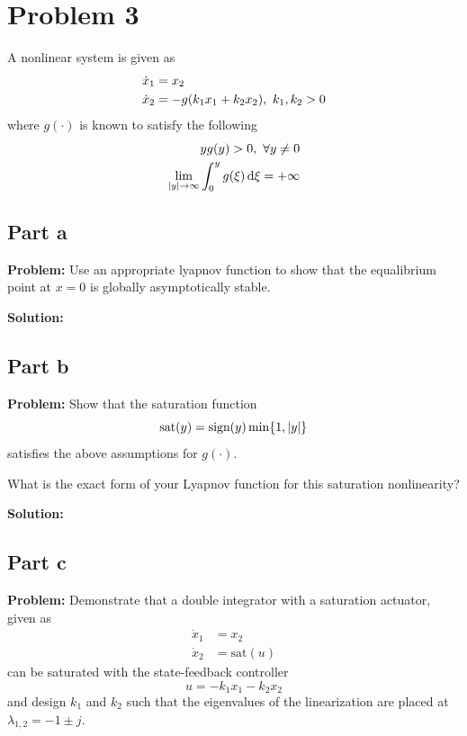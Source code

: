\documentclass[letter]{article}
\begin{document}
\newpage
\section{Problem 3}
A nonlinear system is given as
\begin{equation}
	\begin{aligned}
		\dot{x}_1 &= x_2\\
		\dot{x}_2 &= -g \qty(k_1 x_1 + k_2 x_2), \ k_1, k_2 > 0
	\end{aligned}
\end{equation}
where $g(\cdot)$ is known to satisfy the following
\begin{equation}
	\begin{aligned}
		y g(y) > 0, \ \forall y \neq 0\\
		\lim_{\abs{y} \to \infty} \int_0^y g(\xi) \dd{\xi}  = + \infty
	\end{aligned}
\end{equation}

\subsection{Part a}
\textbf{Problem:}
Use an appropriate lyapnov function to show that the equalibrium point at $x=0$ is globally asymptotically stable.

\noindent
\textbf{Solution:}






\subsection{Part b}
\textbf{Problem:}
Show that the saturation function $$\text{sat}(y) = \text{sign}(y) \min \{1, \abs{y}\}$$ satisfies the above assumptions for $g(\cdot)$.

What is the exact form of your Lyapnov function for this saturation nonlinearity?

\noindent
\textbf{Solution:}










\newpage
\subsection{Part c}
\textbf{Problem:}
Demonstrate that a double integrator with a saturation actuator, given as
\begin{equation}
	\begin{aligned}
		\dot{x}_1 &= x_2\\
		\dot{x}_2 &= \text{sat}(u)
	\end{aligned}
\end{equation}
can be saturated with the state-feedback controller $$ u = -k_1 x_1 - k_2 x_2$$ and design $k_1$ and $k_2$ such that the eigenvalues of the linearization are placed at $\lambda_{1,2} = -1 \pm j$.
\end{document}
